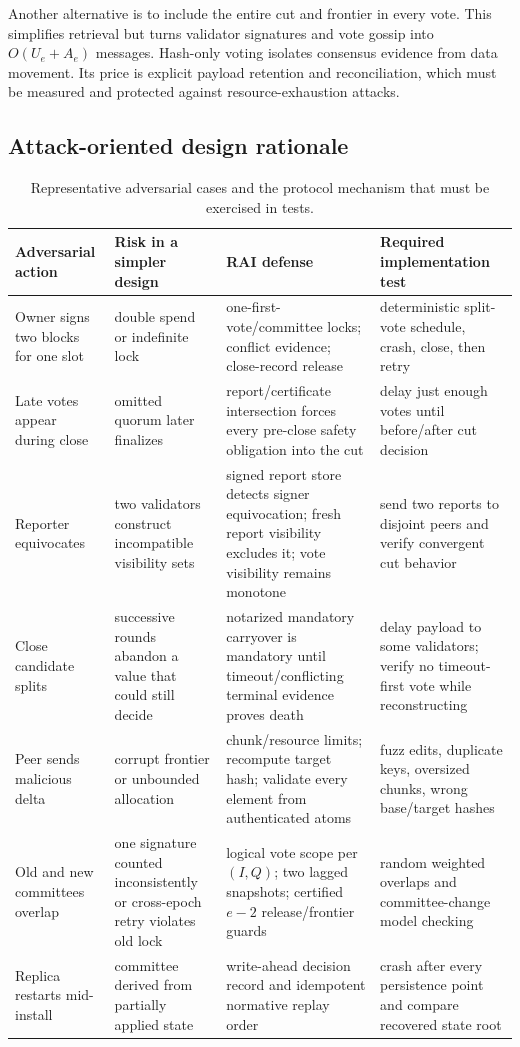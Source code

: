 \documentclass[sigplan,review,anonymous]{acmart}
\newcommand{\sys}{\textsc{RAI}\xspace}
\begin{document}
Another alternative is to include the entire cut and frontier in every vote.  This simplifies retrieval but turns validator signatures and vote gossip into $O(U_e+A_e)$ messages.  Hash-only voting isolates consensus evidence from data movement.  Its price is explicit payload retention and reconciliation, which must be measured and protected against resource-exhaustion attacks.

\subsection{Attack-oriented design rationale}

\begin{table}[t]
\caption{Representative adversarial cases and the protocol mechanism that must be exercised in tests.}
\label{tab:attacks}
\centering
\small
\begin{tabularx}{\textwidth}{@{}p{}p{}X X@{}}
\toprule
Adversarial action & Risk in a simpler design & \sys defense & Required implementation test \\
\midrule
Owner signs two blocks for one slot & double spend or indefinite lock & one-first-vote/committee locks; conflict evidence; close-record release & deterministic split-vote schedule, crash, close, then retry \\
Late votes appear during close & omitted quorum later finalizes & report/certificate intersection forces every pre-close safety obligation into the cut & delay just enough votes until before/after cut decision \\
Reporter equivocates & two validators construct incompatible visibility sets & signed report store detects signer equivocation; fresh report visibility excludes it; vote visibility remains monotone & send two reports to disjoint peers and verify convergent cut behavior \\
Close candidate splits & successive rounds abandon a value that could still decide & notarized mandatory carryover is mandatory until timeout/conflicting terminal evidence proves death & delay payload to some validators; verify no timeout-first vote while reconstructing \\
Peer sends malicious delta & corrupt frontier or unbounded allocation & chunk/resource limits; recompute target hash; validate every element from authenticated atoms & fuzz edits, duplicate keys, oversized chunks, wrong base/target hashes \\
Old and new committees overlap & one signature counted inconsistently or cross-epoch retry violates old lock & logical vote scope per $(I,Q)$; two lagged snapshots; certified $e-2$ release/frontier guards & random weighted overlaps and committee-change model checking \\
Replica restarts mid-install & committee derived from partially applied state & write-ahead decision record and idempotent normative replay order & crash after every persistence point and compare recovered state root \\
\bottomrule
\end{tabularx}
\end{table}
\end{document}

